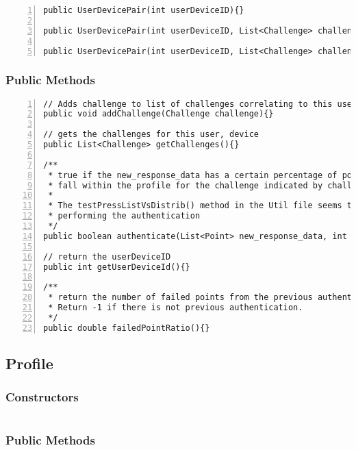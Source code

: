 \documentclass{article} %
\begin{document}
\begin{lstlisting}[numbers=left]
public UserDevicePair(int userDeviceID){}

public UserDevicePair(int userDeviceID, List<Challenge> challenges){}

public UserDevicePair(int userDeviceID, List<Challenge> challenges, double allowed_deviations, double authentication_threshold){}
\end{lstlisting}

\subsubsection{Public Methods}
\begin{lstlisting}[numbers=left]
// Adds challenge to list of challenges correlating to this user/device pair
public void addChallenge(Challenge challenge){}

// gets the challenges for this user, device
public List<Challenge> getChallenges(){}

/**
 * true if the new_response_data has a certain percentage of points which
 * fall within the profile for the challenge indicated by challenge_id
 * 
 * The testPressListVsDistrib() method in the Util file seems to be
 * performing the authentication
 */
public boolean authenticate(List<Point> new_response_data, int challenge_id){}

// return the userDeviceID
public int getUserDeviceId(){}

/**
 * return the number of failed points from the previous authentication.
 * Return -1 if there is not previous authentication.
 */
public double failedPointRatio(){}
\end{lstlisting}

\subsection{Profile}
\subsubsection{Constructors}
\begin{lstlisting}[numbers=left]
%TODO
\end{lstlisting}

\subsubsection{Public Methods}
\begin{lstlisting}[numbers=left]
%TODO
\end{lstlisting}
\end{document}
